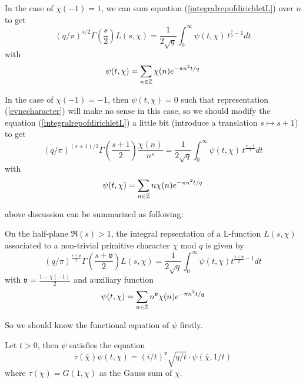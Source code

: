 In the case of \(\chi(-1) = 1\), we can sum equation (\ref{integralrepofdirichletL}) over \(n\) to get 
\begin{equation} \label{evnecharacter}
(q/\pi)^{s/2}\Gamma(\frac{s}{2})L(s,\chi) = \frac{1}{2\sqrt{q}}\int_{0}^{\infty} \psi(t,\chi) \, t^{\frac{s}{2}-1} dt
\end{equation}
with 
\[\psi(t,\chi) =  \sum_{n \in \mathbb{Z}}\chi(n)e^{-\pi n^2 t/q}\]

In the case of \(\chi(-1) = -1\), then \(\psi(t,\chi) = 0\) such that representation (\ref{evnecharacter}) will make no sense in this case, so we should modify the equation (\ref{integralrepofdirichletL}) a little bit (introduce a translation \(s \mapsto s+1\)) to get 
\begin{equation*}
    (q/\pi)^{(s+1)/2}\Gamma(\frac{s+1}{2})\frac{\chi(n)}{n^{s}} = \frac{1}{2\sqrt{q}}\int_{0}^{\infty} \psi(t,\chi) \, t^{\frac{s-1}{2}}dt
\end{equation*}
with
\[\psi(t,\chi) = \sum_{n \in \mathbb{Z} }n \chi(n) e^{-\pi n^2 t/q} \]

above discussion can be summarized as following:

\begin{lemma}
    On the half-plane \(\Re(s) > 1\), the integral repsentation of a  L-function \(L(s,\chi)\) associated to a non-trivial primitive character \(\chi\) mod \(q\) is given by
    \[(q/\pi)^{\frac{s+\mathfrak{v}}{2}}\Gamma(\frac{s+\mathfrak{v}}{2})L(s,\chi) = \frac{1}{2\sqrt{q}}\int_0^{\infty} \psi(t,\chi) t^{\frac{s+\mathfrak{v}}{2}-1} dt\]
    with \(\mathfrak{v} = \frac{1-\chi(-1)}{2}\) and auxiliary function 
    \[\psi(t,\chi) = \sum_{n \in \mathbb{Z}}n^{\mathfrak{v}}\chi(n)e^{-\pi n^2 t/q}\]


\end{lemma}

So we should know the functional equation of \(\psi\) firstly.

\begin{lemma}
    Let \(t>0\), then \(\psi\) satisfies the equation
    \[\tau(\bar{\chi})\psi(t,\chi) = (i/t)^{\mathfrak{v}}\sqrt{q/t} \cdot \psi(\bar{\chi},1/t)\]
    where \(\tau(\chi) = G(1,\chi)\) as the Gauss sum of \(\chi\).

\end{lemma}

